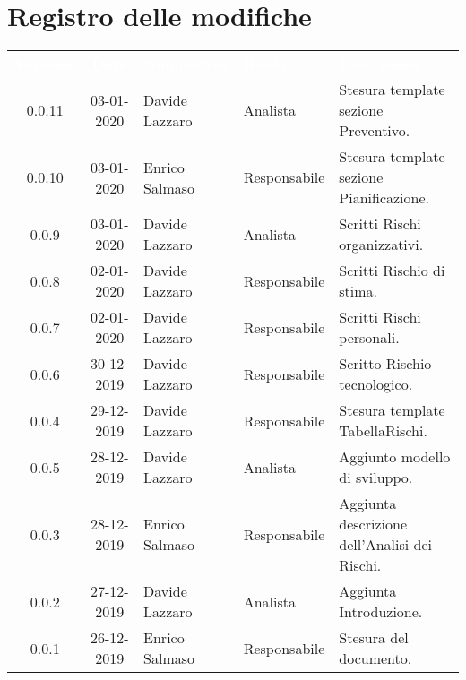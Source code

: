 \section*{Registro delle modifiche}
{
\renewcommand{\arraystretch}{1.5}
\centering
\begin{longtable}{ c c  C{4cm}  C{3cm} C{4cm}}
\textcolor{white}{\textbf{Versione}} & \textcolor{white}{\textbf{Data}} & \textcolor{white}{\textbf{Nominativo}} & \textcolor{white}{\textbf{Ruolo}} & \textcolor{white}{\textbf{Descrizione}}\\	

0.0.11 & 03-01-2020 & Davide Lazzaro & Analista & Stesura template sezione Preventivo.\\
0.0.10 & 03-01-2020 & Enrico Salmaso & Responsabile & Stesura template sezione Pianificazione.\\
0.0.9 & 03-01-2020 & Davide Lazzaro & Analista & Scritti Rischi organizzativi. \\
0.0.8 & 02-01-2020 & Davide Lazzaro & Responsabile & Scritti Rischio di stima. \\
0.0.7 & 02-01-2020 & Davide Lazzaro & Responsabile & Scritti Rischi personali. \\
0.0.6 & 30-12-2019 & Davide Lazzaro & Responsabile & Scritto Rischio tecnologico. \\
0.0.4 & 29-12-2019 & Davide Lazzaro & Responsabile & Stesura template TabellaRischi.\\
0.0.5 & 28-12-2019 & Davide Lazzaro & Analista & Aggiunto modello di sviluppo.\\
0.0.3 & 28-12-2019 & Enrico Salmaso & Responsabile & Aggiunta descrizione dell'Analisi dei Rischi. \\
0.0.2 & 27-12-2019 & Davide Lazzaro & Analista & Aggiunta Introduzione. \\
0.0.1 & 26-12-2019 & Enrico Salmaso & Responsabile & Stesura del documento.  \\
		
\end{longtable}
}